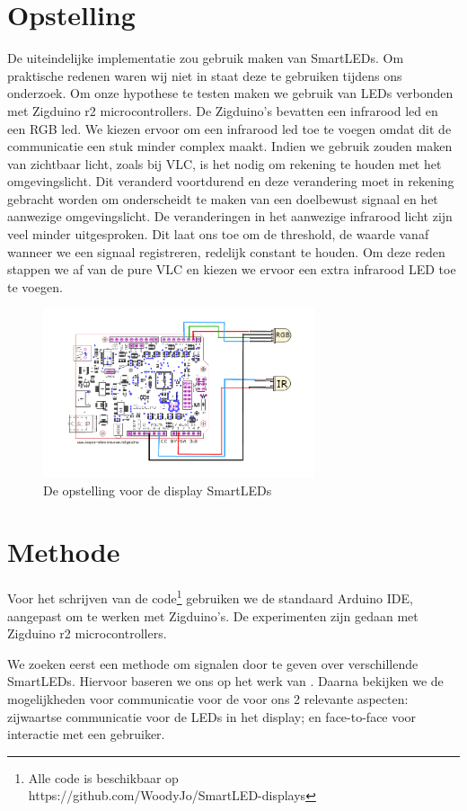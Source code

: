 \documentclass{article}
\begin{document}
\section{Opstelling}
De uiteindelijke implementatie zou gebruik maken van SmartLEDs. Om praktische redenen waren wij niet in staat deze te gebruiken tijdens ons onderzoek. 
Om onze hypothese te testen maken we gebruik van LEDs verbonden met Zigduino r2 microcontrollers. De Zigduino’s bevatten een infrarood led en een RGB led. We kiezen ervoor om een infrarood led toe te voegen omdat dit de communicatie een stuk minder complex maakt. Indien we gebruik zouden maken van zichtbaar licht, zoals bij VLC, is het nodig om rekening te houden met het omgevingslicht. Dit veranderd voortdurend en deze verandering moet in rekening gebracht worden om onderscheidt te maken van een doelbewust signaal en het aanwezige omgevingslicht. De veranderingen in het aanwezige infrarood licht zijn veel minder uitgesproken. Dit laat ons toe om de threshold, de waarde vanaf wanneer we een signaal registreren, redelijk constant te houden. Om deze reden stappen we af van de pure VLC en kiezen we ervoor een extra infrarood LED toe te voegen.

\begin{figure}[H]
\centering
\includegraphics[width=8cm]{Opstelling.png}
\caption{De opstelling voor de display SmartLEDs}
\label{fig:opstelling}
\end{figure}


\section{Methode}

Voor het schrijven van de code\footnote{Alle code is beschikbaar op \\ https://github.com/WoodyJo/SmartLED-displays} gebruiken we de standaard Arduino IDE, aangepast om te werken met Zigduino's. De experimenten zijn gedaan met Zigduino r2 microcontrollers.

We zoeken eerst een methode om signalen door te geven over verschillende SmartLEDs. Hiervoor baseren we ons op het werk van \cite{smartLED}. Daarna bekijken we de mogelijkheden voor communicatie voor de voor ons 2 relevante aspecten: zijwaartse communicatie voor de LEDs in het display; en face-to-face voor interactie met een gebruiker.
 
\end{document}
